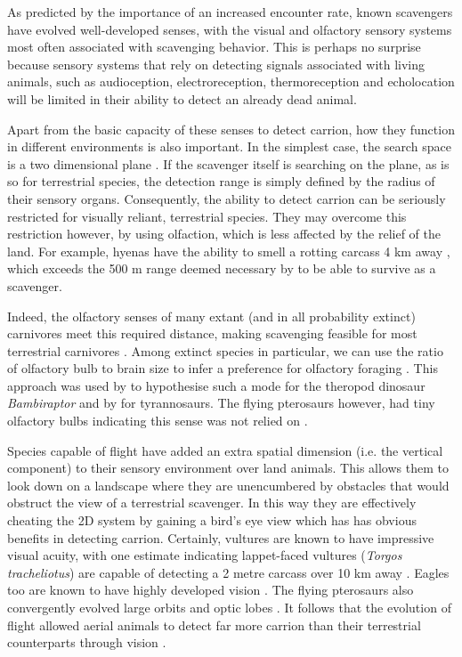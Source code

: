 \documentclass[a4paper,12pt]{article}
\begin{document}
As predicted by the importance of an increased encounter rate, known scavengers have evolved well-developed senses, with the visual and olfactory sensory systems most often associated with scavenging behavior. 
This is perhaps no surprise because sensory systems that rely on detecting signals associated with living animals, such as audioception, electroreception, thermoreception and echolocation will be limited in their ability to detect an already dead animal.

Apart from the basic capacity of these senses to detect carrion, how they function in different environments is also important. 
In the simplest case, the search space is a two dimensional plane \citep{pawar2012dimensionality}. 
If the scavenger itself is searching on the plane, as is so for terrestrial species, the detection range is simply defined by the radius of their sensory organs.
Consequently, the ability to detect carrion can be seriously restricted for visually reliant, terrestrial species. 
They may overcome this restriction however, by using olfaction, which is less affected by the relief of the land.
For example, hyenas have the ability to smell a rotting carcass 4 km away \citep{mills1989comparative}, which exceeds the 500 m range deemed necessary by \cite{ruxton2004obligate} to be able to survive as a scavenger. 

Indeed, the olfactory senses of many extant (and in all probability extinct) carnivores meet this required distance, making scavenging feasible for most terrestrial carnivores \citep{farlow1994speculations,mech2010wolves}. 
Among extinct species in particular, we can use the ratio of olfactory bulb to brain size to infer a preference for olfactory foraging \citep{zelenitsky2011evolution}.
This approach was used by \cite{zelenitsky2011evolution} to hypothesise such a mode for the theropod dinosaur \textit{Bambiraptor} and by \cite{witmer2009new} for tyrannosaurs.
The flying pterosaurs however, had tiny olfactory bulbs indicating this sense was not relied on \citep{witton2013pterosaurs}.

Species capable of flight have added an extra spatial dimension (i.e. the vertical component) to their sensory environment over land animals.
This allows them to look down on a landscape where they are unencumbered by obstacles that would obstruct the view of a terrestrial scavenger.
In this way they are effectively cheating the 2D system by gaining a bird's eye view which has has obvious benefits in detecting carrion.
Certainly, vultures are known to have impressive visual acuity, with one estimate indicating lappet-faced vultures (\textit{Torgos tracheliotus}) are capable of detecting a 2 metre carcass over 10 km away \citep{spiegel2013factors}.
Eagles too are known to have highly developed vision \citep{reymond1985spatial}.
The flying pterosaurs also convergently evolved large orbits and optic lobes \citep{witton2013pterosaurs}. 
It follows that the evolution of flight allowed aerial animals to detect far more carrion than their terrestrial counterparts through vision \citep{AR:AR22815}.
\end{document}
